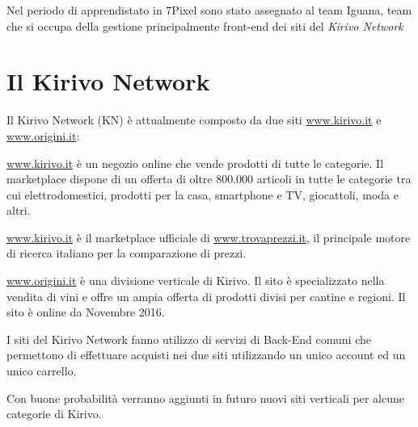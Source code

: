 


Nel periodo di apprendistato in 7Pixel sono stato assegnato al team Iguana, team che si occupa
della gestione principalmente front-end dei siti del \emph{Kirivo Network}

\section{Il Kirivo Network}
Il Kirivo Network (KN) è attualmente composto da due siti  \url{www.kirivo.it} 
e \url{www.origini.it}:

\url{www.kirivo.it} è un negozio online che vende prodotti di tutte le categorie.
Il marketplace dispone di un offerta di oltre 800.000 articoli in tutte le categorie tra cui
elettrodomestici, prodotti per la casa, smartphone e TV, giocattoli, moda e altri.

\url{www.kirivo.it} è il marketplace ufficiale di \url{www.trovaprezzi.it}, il principale motore
di ricerca italiano per la comparazione di prezzi.

\url{www.origini.it} è una divisione verticale di Kirivo. Il sito è specializzato nella vendita
di vini e offre un ampia offerta di prodotti divisi per cantine e regioni. Il sito
è online da Novembre 2016.

I siti del Kirivo Network fanno utilizzo di servizi di Back-End comuni che permettono 
di effettuare acquisti nei due siti utilizzando un unico account ed un unico carrello.

Con buone probabilità verranno aggiunti in futuro nuovi siti verticali per alcune categorie
di Kirivo.

